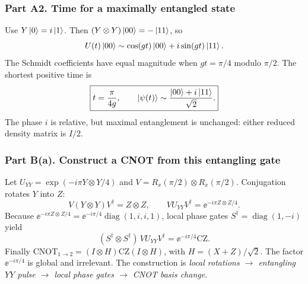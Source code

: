 \subsubsection*{Part A2. Time for a maximally entangled state}
Use $Y\left\lvert 0\right\rangle=i\left\lvert 1\right\rangle$. Then $(Y\otimes Y)\left\lvert 00\right\rangle=-\left\lvert 11\right\rangle$, so
\begin{equation}U(t)\left\lvert 00\right\rangle\sim\cos(gt)\left\lvert 00\right\rangle+i\sin(gt)\left\lvert 11\right\rangle.\end{equation}
The Schmidt coefficients have equal magnitude when $gt=\pi/4$ modulo $\pi/2$. The shortest positive time is
\begin{equation}\boxed{t=\frac{\pi}{4g},\qquad \left\lvert \psi(t)\right\rangle\sim\frac{\left\lvert 00\right\rangle+i\left\lvert 11\right\rangle}{\sqrt2}.}\end{equation}
The phase $i$ is relative, but maximal entanglement is unchanged: either reduced density matrix is $I/2$.

\subsubsection*{Part B(a). Construct a CNOT from this entangling gate}
Let $U_{YY}=\exp(-i\pi Y\otimes Y/4)$ and $V=R_x(\pi/2)\otimes R_x(\pi/2)$. Conjugation rotates $Y$ into $Z$:
\begin{equation}V(Y\otimes Y)V^\dagger=Z\otimes Z,\qquad VU_{YY}V^\dagger=\ee^{-i\pi Z\otimes Z/4}.\end{equation}
Because $\ee^{-i\pi Z\otimes Z/4}=\ee^{-i\pi/4}\operatorname{diag}(1,i,i,1)$, local phase gates $S^\dagger=\operatorname{diag}(1,-i)$ yield
\begin{equation}\boxed{(S^\dagger\otimes S^\dagger)\,VU_{YY}V^\dagger=\ee^{-i\pi/4}\mathrm{CZ}.}\end{equation}
Finally $\mathrm{CNOT}_{1\rightarrow2}=(I\otimes H)\mathrm{CZ}(I\otimes H)$, with $H=(X+Z)/\sqrt2$. The factor $\ee^{-i\pi/4}$ is global and irrelevant. The construction is \emph{local rotations $\to$ entangling $YY$ pulse $\to$ local phase gates $\to$ CNOT basis change}.